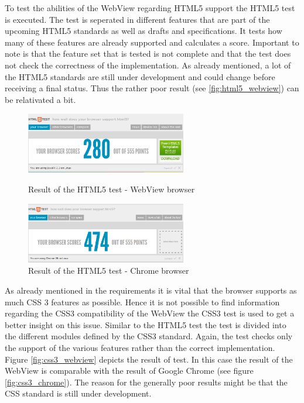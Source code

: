 
To test the abilities of the WebView regarding HTML5 support the HTML5 test \autocite{tech-ana:html5-test} is executed.
The test is seperated in different features that are part of the upcoming HTML5 standards as well as drafts and specifications.
It tests how many of these features are already supported and calculates a score.
Important to note is that the feature set that is tested is not complete and that the test does not check the correctness of the implementation.
As already mentioned, a lot of the HTML5 standards are still under development and could change before receiving a final status.
Thus the rather poor result (see \ref{fig:html5_webview}) can be relativated a bit.

\begin{figure}
\begin{minipage}[t]{7cm}
	\centering
	\includegraphics[width=7cm]{./img/tech-ana/html5_result_webview.png}
	\caption{Result of the HTML5 test - WebView browser}
	\label{fig:html5_webview}
\end{minipage}
\hfill
\begin{minipage}[t]{7cm}
	\centering
	\includegraphics[width=7cm]{./img/tech-ana/html5_result_chrome.png}
	\caption{Result of the HTML5 test - Chrome browser}
	\label{fig:html5_chrome}
\end{minipage}
\end{figure}


As already mentioned in the requirements it is vital that the browser supports as much CSS 3 features as possible.
Hence it is not possible to find information regarding the CSS3 compatibility of the WebView the CSS3 test  \autocite{tech-ana:css3-test} is used to get a better insight on this issue.
Similar to the HTML5 test the test is divided into the different modules defined by the CSS3 standard.
Again, the test checks only the support of the various features rather than the correct implementation.
Figure \ref{fig:css3_webview} depicts the result of test.
In this case the result of the WebView is comparable with the result of Google Chrome (see figure \ref{fig:css3_chrome}).
The reason for the generally poor results might be that the CSS standard is still under development.

